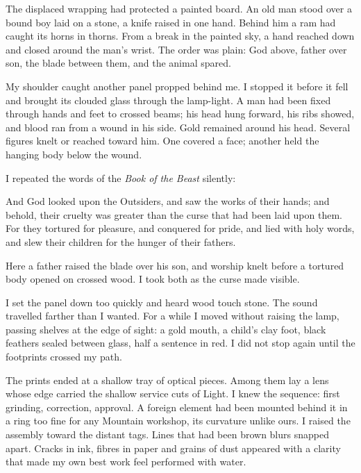 The displaced wrapping had protected a painted board. An old man stood over a bound boy laid on a stone, a knife raised in one hand. Behind him a ram had caught its horns in thorns. From a break in the painted sky, a hand reached down and closed around the man's wrist. The order was plain: God above, father over son, the blade between them, and the animal spared.\par

My shoulder caught another panel propped behind me. I stopped it before it fell and brought its clouded glass through the lamp-light. A man had been fixed through hands and feet to crossed beams; his head hung forward, his ribs showed, and blood ran from a wound in his side. Gold remained around his head. Several figures knelt or reached toward him. One covered a face; another held the hanging body below the wound.\par

I repeated the words of the \textit{Book of the Beast} silently:\par

\begin{scripture}
And God looked upon the Outsiders, and saw the works of their hands; and behold, their cruelty was greater than the curse that had been laid upon them. For they tortured for pleasure, and conquered for pride, and lied with holy words, and slew their children for the hunger of their fathers.
\end{scripture}

Here a father raised the blade over his son, and worship knelt before a tortured body opened on crossed wood. I took both as the curse made visible.\par

I set the panel down too quickly and heard wood touch stone. The sound travelled farther than I wanted. For a while I moved without raising the lamp, passing shelves at the edge of sight: a gold mouth, a child's clay foot, black feathers sealed between glass, half a sentence in red. I did not stop again until the footprints crossed my path.\par

The prints ended at a shallow tray of optical pieces. Among them lay a lens whose edge carried the shallow service cuts of Light. I knew the sequence: first grinding, correction, approval. A foreign element had been mounted behind it in a ring too fine for any Mountain workshop, its curvature unlike ours. I raised the assembly toward the distant tags. Lines that had been brown blurs snapped apart. Cracks in ink, fibres in paper and grains of dust appeared with a clarity that made my own best work feel performed with water.\par

